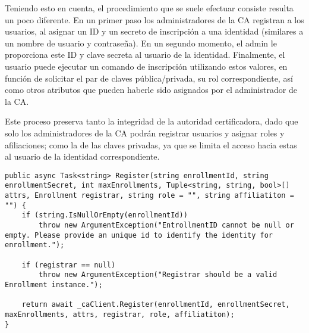 Teniendo esto en cuenta, el procedimiento que se suele efectuar consiste resulta un poco diferente. En un primer paso los administradores de la CA registran a los usuarios, al asignar un ID y un secreto de inscripción a una identidad (similares a un nombre de usuario y contraseña). En un segundo momento, el admin le proporciona este ID y clave secreta al usuario de la identidad. Finalmente, el usuario puede ejecutar un comando de inscripción utilizando estos valores, en funci\'on de solicitar el par de claves pública/privada, su rol correspondiente, as\'i como otros atributos que pueden haberle sido asignados por el administrador de la CA.

Este proceso preserva tanto la integridad de la autoridad certificadora, dado que solo los administradores de la CA podr\'an registrar usuarios y asignar roles y afiliaciones; como la de las claves privadas, ya que se limita el acceso hacia estas al usuario de la identidad correspondiente.

\begin{lstlisting}[caption={M\'etodo \texttt{Register} de la clase \texttt{CAService}.}, label={code:registerServ}]
public async Task<string> Register(string enrollmentId, string enrollmentSecret, int maxEnrollments, Tuple<string, string, bool>[] attrs, Enrollment registrar, string role = "", string affiliatiton = "") {
	if (string.IsNullOrEmpty(enrollmentId))
		throw new ArgumentException("EntrollmentID cannot be null or empty. Please provide an unique id to identify the identity for enrollment.");
	
	if (registrar == null)
		throw new ArgumentException("Registrar should be a valid Enrollment instance.");

	return await _caClient.Register(enrollmentId, enrollmentSecret, maxEnrollments, attrs, registrar, role, affiliatiton);
}
\end{lstlisting}

